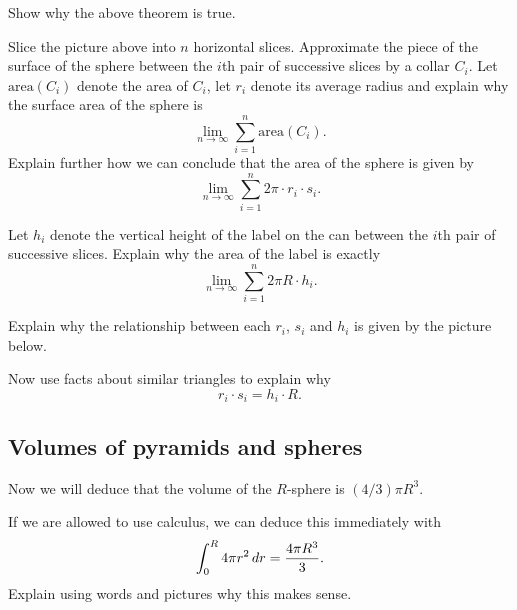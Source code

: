 \documentclass[hints,handout,noauthor,nooutcomes,12pt,newpage]{ximera}
\begin{document}
\begin{problem}
Show why the above theorem is true.

\begin{hint}
Slice the picture above into $n$ horizontal slices. Approximate the
piece of the surface of the sphere between the $i$th pair of
successive slices by a collar $C_{i}$. Let $\mathrm{area}( C_{i}) $
denote the area of $C_{i}$, let $r_{i}$ denote its average radius and
explain why the surface area of the sphere is
\[
\lim_{n\to \infty}\sum_{i=1}^{n} \mathrm{area}(C_i).
\]
Explain further how we can conclude that the area of the sphere is
given by
\[%
\lim_{n\to \infty}\sum_{i=1}^{n} 2\pi\cdot r_{i}\cdot s_{i}.
\]

\end{hint}
\begin{hint}
Let $h_{i}$ denote the vertical height of the label on the can between
the $i$th pair of successive slices. Explain why the area of the label is exactly%
\[%
\lim_{n\to\infty}\sum_{i=1}^{n} 2\pi R \cdot h_{i}.
\]
\end{hint}
\begin{hint}
Explain why the relationship between each $r_{i}$, $s_{i}$ and $h_{i}$
is given by the picture below.
\begin{image}
\end{image}
Now use facts about similar triangles to explain why
\[
r_{i}\cdot s_{i}=h_{i}\cdot R.
\]
\end{hint}
\end{problem}




\subsection{Volumes of pyramids and spheres}

Now we will deduce that the volume of the $R$-sphere is $(4/3) \pi
R^3$.

\begin{problem}
  If we are allowed to use calculus, we can deduce this immediately with
  \[
  \int_0^R 4\pi r^2 \,d r = \frac{4\pi R^3}{3}.
  \]
  Explain using words and pictures why this makes sense.
\end{problem}
\end{document}
